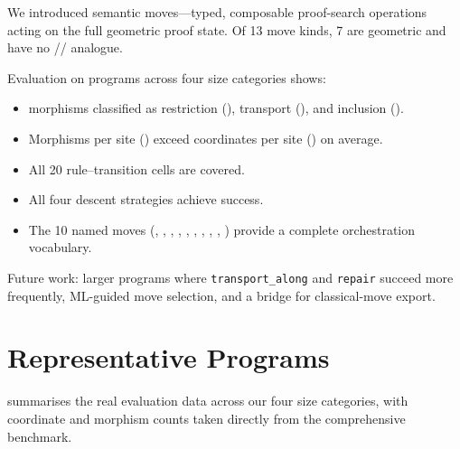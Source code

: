 \documentclass[11pt]{article}
\begin{document}
We introduced semantic moves---typed, composable proof-search
operations acting on the full geometric proof state.  Of 13
move kinds, 7 are geometric and have no \LEAN/\Coq/\Fstar{}
analogue.

Evaluation on \compTotalPrograms{} programs across four size categories shows:
\begin{itemize}[nosep]
  \item \compMorphTotal{} morphisms classified as restriction
        (\compMorphRestrictionPct), transport (\compMorphTransportPct),
        and inclusion (\compMorphInclusionPct).
  \item Morphisms per site (\compSiteMeanMorphisms) exceed
        coordinates per site (\compSiteMeanCoords) on average.
  \item All 20 rule--transition cells are covered.
  \item All four descent strategies achieve \compDescentEagerRate{} success.
  \item The 10 named moves (\VERIFY, \CONSTRUCT, \NORMALIZE,
        \GLUE, \RESTRICT, \TRANSPORT, \REPAIR, \PROMOTE,
        \CHALLENGE, \ESCALATE) provide a complete orchestration
        vocabulary.
\end{itemize}

Future work: larger programs where \texttt{transport\_along}
and \texttt{repair} succeed more frequently, ML-guided
move selection, and a \LEAN{} bridge for classical-move export.


\appendix
\section{Representative Programs}\label{app:programs}

 summarises the real evaluation data
across our four size categories, with coordinate and morphism
counts taken directly from the comprehensive benchmark.
\end{document}
